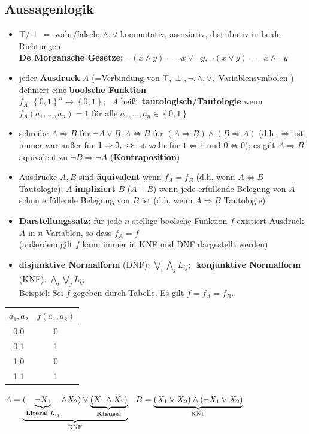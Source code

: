 \documentclass[10pt,a4paper]{article}
\begin{document}
\subsection{Aussagenlogik}
\begin{itemize}
\item $\top/\perp=$ wahr/falsch; $\land, \lor$ kommutativ, assoziativ, distributiv in beide Richtungen\\ \textbf{De Morgansche Gesetze:} $\lnot (x\land y)=\lnot x \lor \lnot y, \lnot (x\lor y)=\lnot x \land \lnot y$
\item jeder \textbf{Ausdruck} $A$ (=Verbindung von $\top,\perp,\lnot,\land,\lor,$ Variablensymbolen ) definiert eine \textbf{boolsche Funktion} \\ $f_{A}: \left\lbrace 0,1\right\rbrace ^{n} \rightarrow \left\lbrace 0,1\right\rbrace;\;\;A$ heißt \textbf{tautologisch/Tautologie} wenn $f_{A}(a_{1},\dotsc, a_{n})=1$ für alle $a_{1},\dotsc, a_{n} \in \left\lbrace 0,1\right\rbrace$  
\item schreibe $A\Rightarrow B$ für $\lnot A\lor B, A\Leftrightarrow B$ für $(A\Rightarrow B)\land (B\Rightarrow A)$ (d.h. $\Rightarrow$ ist immer war außer für $1 \Rightarrow 0,\\ \Leftrightarrow$ ist wahr für $1\Leftrightarrow 1$ und $0\Leftrightarrow 0$); es gilt $A\Rightarrow B$ äquivalent zu $\lnot B\Rightarrow \lnot A$ (\textbf{Kontraposition})
\item Ausdrücke $A,B$ sind \textbf{äquivalent} wenn $f_{A}=f_{B}$ (d.h. wenn $A\Leftrightarrow B $ Tautologie); $A$ \textbf{impliziert} $B$ ($A\models B$) wenn jede erfüllende Belegung von $A$ schon erfüllende Belegung von $B$ ist (d.h. wenn $A\Rightarrow B$ Tautologie)
\item \textbf{Darstellungssatz:} für jede $n$-stellige boolsche Funktion $f$ existiert Ausdruck $A$ in $n$ Variablen, so dass $f_{A}=f$\\
(außerdem gilt $f$ kann immer in KNF und DNF dargestellt werden)
\item  \textbf{disjunktive Normalform} (DNF): $\bigvee_{i} \bigwedge_{j} L_{ij};\;\;$\textbf{konjunktive Normalform} (KNF): $\bigwedge_{i} \bigvee_{j} L_{ij}$\\
Beispiel: Sei $f$ gegeben durch Tabelle. Es gilt $f=f_{A}=f_{B}$.
\end{itemize}
 \begin{tabular}{c|c}
$a_{1},a_{2}$ & $f(a_{1},a_{2})$\\
\hline
0,0&0\\
0,1&1\\
1,0&0\\
1,1&1
\end{tabular} $A=\underbrace{(\underbrace{\lnot X_{1}}_{\text{\textbf{Literal} } L_{ij}} \land X_{2})\lor \underbrace{(X_{1}\land X_{2})}_{\text{\textbf{Klausel}}}}_{\text{DNF}}\;\;\;B=\underbrace{(X_{1}\lor X_{2})\land (\lnot X_{1}\lor X_{2})}_{\text{KNF}}$
\end{document}
